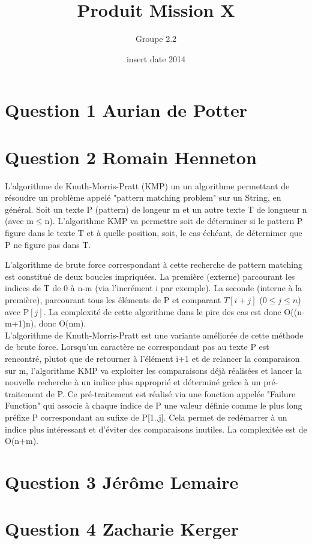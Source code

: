 \documentclass[10pt,a4paper]{article}
\date{insert date 2014}
\author{Groupe 2.2}
\title{Produit Mission X}
\begin{document}
\maketitle

\section*{Question 1 Aurian de Potter}
\section*{Question 2 Romain Henneton}
L'algorithme de Knuth-Morris-Pratt (KMP) un un algorithme permettant de résoudre un problème appelé "pattern matching problem" sur un String, en général. Soit un texte P (pattern) de longeur m et un autre texte T de longueur n (avec m$\leq$n). L'algorithme KMP va permettre soit de déterminer si le pattern P figure dans le texte T et à quelle position, soit, le cas échéant, de déternimer que P ne figure pas dans T.



L'algorithme de brute force correspondant à cette recherche de pattern matching est constitué de deux boucles impriquées. La première (externe) parcourant les indices de T de 0 à n-m (via l'incrément i par exemple). La seconde (interne à la première), parcourant tous les éléments de P et comparant $T[i+j]$ ($0\leq j\leq n$) avec P$[j]$. La complexité de cette algorithme dans le pire des cas est donc O((n-m+1)n), donc O(nm).\\
L'algorithme de Knuth-Morris-Pratt est une variante améliorée de cette méthode de brute force. Lorsqu'un caractère ne correspondant pas au texte P est rencontré, plutot que de retourner à l'élément i+1 et de relancer la comparaison sur m, l'algorithme KMP va exploiter les comparaisons déjà réalisées et lancer la nouvelle recherche à un indice plus approprié et déterminé grâce à un pré-traitement de P. Ce pré-traitement est réalisé via une fonction appelée "Failure Function" qui associe à chaque indice de P une valeur définie comme le plus long préfixe P correspondant au sufixe de P[1..j]. Cela permet de redémarrer à un indice plus intéressant et d'éviter des comparaisons inutiles. La complexitée  est de O(n+m).
\section*{Question 3 Jérôme Lemaire}
\section*{Question 4 Zacharie Kerger}
\end{document}
